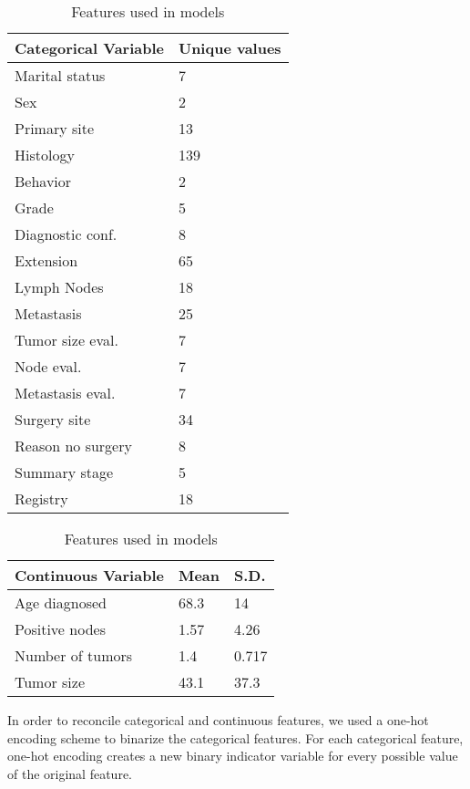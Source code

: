 \documentclass[review]{elsarticle}
\begin{document}
\begin{table}[H]
	\centering
	\tiny
	\begin{tabular}{ll}
		\textbf{Categorical Variable} & \textbf{Unique values}  \\ 
		\hline
		Marital status    & 7                       \\
		Sex               & 2                       \\
		Primary site      & 13                      \\
		Histology         & 139                     \\
		Behavior          & 2                       \\
		Grade             & 5                       \\
		Diagnostic conf.  & 8                       \\
		Extension         & 65                      \\
		Lymph Nodes       & 18                      \\
		Metastasis        & 25                      \\
		Tumor size eval.  & 7                       \\
		Node eval.        & 7                       \\
		Metastasis eval.  & 7                       \\
		Surgery site      & 34                      \\
		Reason no surgery & 8                       \\
		Summary stage     & 5                       \\
		Registry          & 18                      \\
	\end{tabular}
	\quad
	\centering
	\begin{tabular}{lll}
		\textbf{Continuous Variable} & \textbf{Mean} & \textbf{S.D.}  \\ 
		\hline
		Age diagnosed     & 68.3          & 14             \\
		Positive nodes    & 1.57          & 4.26           \\
		Number of tumors  & 1.4           & 0.717          \\
		Tumor size        & 43.1          & 37.3          
	\end{tabular}
	\caption{Features used in models}
	\label{variable-info}
\end{table}

In order to reconcile categorical and continuous features, we used a one-hot encoding scheme to binarize the categorical features. For each categorical feature, one-hot encoding creates a new binary indicator variable for every possible value of the original feature. 
\end{document}
